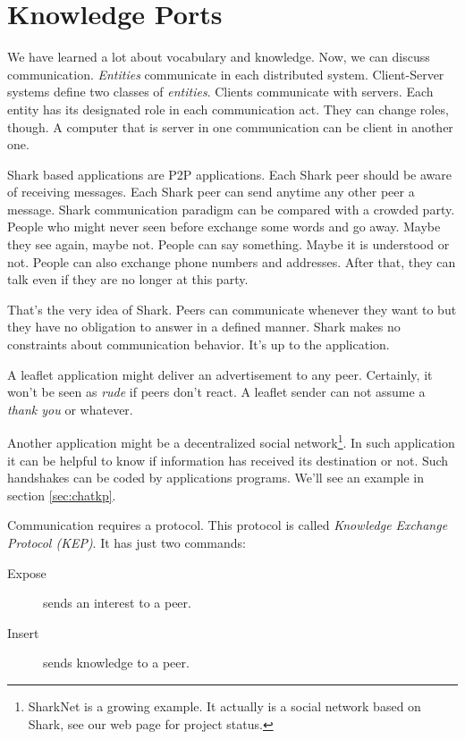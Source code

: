 \chapter{Knowledge Ports}
\label{sec:knowledgePorts}
We have learned a lot about vocabulary and knowledge. Now, we can discuss communication. {\it Entities} communicate in each distributed system. Client-Server systems define two classes of {\it entities}. Clients communicate with servers. Each entity has its designated role in each communication act. They can change roles, though. A computer that is server in one communication can be client in another one.

Shark based applications are P2P applications. Each Shark peer should be aware of receiving messages. Each Shark peer can send anytime any other peer a message. Shark communication paradigm can be compared with a crowded party. People who might never seen before exchange some words and go away. Maybe they see again, maybe not. People can say something. Maybe it is understood or not.
People can also exchange phone numbers and addresses. After that, they can talk even if they are no longer at this party. 

That's the very idea of Shark. Peers can communicate whenever they want to but they have no obligation to answer in a defined manner. Shark makes no constraints about communication behavior. It's up to the application.

A leaflet application might deliver an advertisement to any peer. Certainly, it won't be seen as {\it rude} if peers don't react. A leaflet sender can not assume a {\it thank you} or whatever.

Another application might be a decentralized social network\footnote{SharkNet is
a growing example. It actually is a social network based on Shark, see our web page for project status.}. In such application it can be helpful to know if information has received its destination or not. Such handshakes can be coded by applications programs. We'll see an example in section \ref{sec:chatkp}.

Communication requires a protocol. This protocol is called {\it Knowledge Exchange Protocol (KEP)}. It has just two commands: 

\begin{description}
    \item[Expose] sends an interest to a peer.
    \item[Insert] sends knowledge to a peer.
\end{description}

